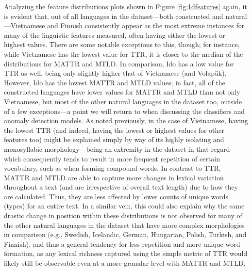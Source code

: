 \documentclass[12pt,a4paper]{article}
\numberwithin{figure}{section}
\numberwithin{table}{section}
\numberwithin{definition}{section}
\begin{document}
Analyzing the feature distributions plots shown in Figure \ref{fig:1dfeatures} again, it is evident that, out of all languages in the dataset---both constructed and natural---Vietnamese and Finnish consistently appear as the most extreme instances for many of the linguistic features measured, often having either the lowest or highest values. There are some notable exceptions to this, though; for instance, while Vietnamese has the lowest value for TTR, it is closer to the median of the distributions for MATTR and MTLD. In comparison, Ido has a low value for TTR as well, being only slightly higher that of Vietnamese (and Volapük). However, Ido has the lowest MATTR and MTLD values; in fact, all of the constructed languages have lower values for MATTR and MTLD than not only Vietnamese, but most of the other natural languages in the dataset too, outside of a few exceptions---a point we will return to when discussing the classifiers and anomaly detection models. As noted previously, in the case of Vietnamese, having the lowest TTR (and indeed, having the lowest or highest values for other features too) might be explained simply by way of its highly isolating and monosyllabic morphology---being an extremity in the dataset in that regard---which consequently tends to result in more frequent repetition of certain vocabulary, such as when forming compound words. In contrast to TTR, MATTR and MTLD are able to capture more changes in lexical variation throughout a text (and are irrespective of overall text length) due to how they are calculated. Thus, they are less affected by lower counts of unique words (types) for an entire text. In a similar vein, this could also explain why the same drastic change in position within these distributions is not observed for many of the other natural languages in the dataset that have more complex morphologies in comparison (e.g., Swedish, Icelandic, German, Hungarian, Polish, Turkish, and Finnish), and thus a general tendency for less repetition and more unique word formation, as any lexical richness captured using the simple metric of TTR would likely still be observable even at a more granular level with MATTR and MTLD.
\end{document}
